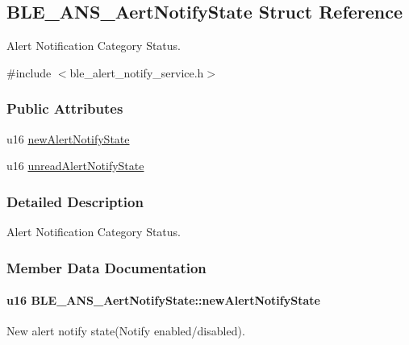 \hypertarget{struct_b_l_e___a_n_s___aert_notify_state}{}\subsection{B\+L\+E\+\_\+\+A\+N\+S\+\_\+\+Aert\+Notify\+State Struct Reference}
\label{struct_b_l_e___a_n_s___aert_notify_state}


Alert Notification Category Status.  




{\ttfamily \#include $<$ble\+\_\+alert\+\_\+notify\+\_\+service.\+h$>$}

\subsubsection*{Public Attributes}
\begin{DoxyCompactItemize}
\item 
u16 \hyperlink{struct_b_l_e___a_n_s___aert_notify_state_a1c2d47708a813543b36264a776db0324}{new\+Alert\+Notify\+State}
\item 
u16 \hyperlink{struct_b_l_e___a_n_s___aert_notify_state_af5819cc66beed79f412ec8311186846c}{unread\+Alert\+Notify\+State}
\end{DoxyCompactItemize}


\subsubsection{Detailed Description}
Alert Notification Category Status. 

\subsubsection{Member Data Documentation}
\paragraph[{\texorpdfstring{new\+Alert\+Notify\+State}{newAlertNotifyState}}]{\setlength{\rightskip}{0pt plus 5cm}u16 B\+L\+E\+\_\+\+A\+N\+S\+\_\+\+Aert\+Notify\+State\+::new\+Alert\+Notify\+State}\hypertarget{struct_b_l_e___a_n_s___aert_notify_state_a1c2d47708a813543b36264a776db0324}{}\label{struct_b_l_e___a_n_s___aert_notify_state_a1c2d47708a813543b36264a776db0324}
New alert notify state(Notify enabled/disabled). 
